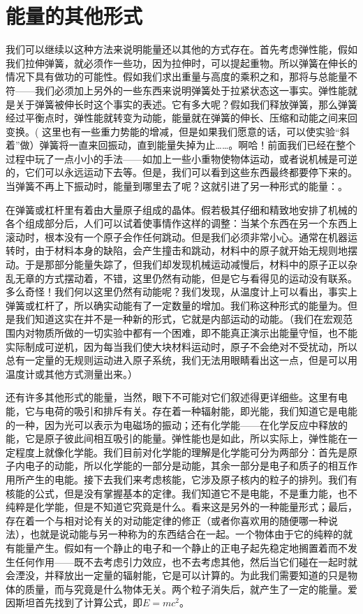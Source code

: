 \section{能量的其他形式}

我们可以继续以这种方法来说明能量还以其他的方式存在。首先考虑弹性能，假如我们拉伸弹簧，就必须作一些功，因为拉伸时，可以提起重物。所以弹簧在伸长的情况下具有做功的可能性。假如我们求出重量与高度的乘积之和，那将与总能量不符——我们必须加上另外的一些东西来说明弹簧处于拉紧状态这一事实。弹性能就是关于弹簧被伸长时这个事实的表述。它有多大呢？假如我们释放弹簧，那么弹簧经过平衡点时，弹性能就转变为动能，能量就在弹簧的伸长、压缩和动能之间来回变换。( 这里也有一些重力势能的增减，但是如果我们愿意的话，可以使实验“斜着”做）弹簧将一直来回振动，直到能量失掉为止……。啊哈！前面我们已经在整个过程中玩了一点小小的手法——如加上一些小重物使物体运动，或者说机械是可逆的，它们可以永远运动下去等。但是，我们可以看到这些东西最终都要停下来的。当弹簧不再上下振动时，能量到哪里去了呢？这就引进了另一种形式的能量：。

在弹簧或杠杆里有着由大量原子组成的晶体。假若极其仔细和精致地安排了机械的各个组成部分后，人们可以试着使事情作这样的调整：当某个东西在另一个东西上滚动时，根本没有一个原子会作任何跳动。但是我们必须非常小心。通常在机器运转时，由于材料本身的缺陷，会产生撞击和跳动，材料中的原子就开始无规则地摆动。于是那部分能量失踪了，但我们却发现机械运动减慢后，材料中的原子正以杂乱无章的方式摆动着，不错，这里仍然有动能，但是它与看得见的运动没有联系。多么奇怪！我们何以这里仍然有动能呢？我们发现，从温度计上可以看出，事实上弹簧或杠杆了，所以确实动能有了一定数量的增加。我们称这种形式的能量为。但是我们知道这实在并不是一种新的形式，它就是内部运动的动能。（我们在宏观范围内对物质所做的一切实验中都有一个困难，即不能真正演示出能量守恒，也不能实际制成可逆机，因为每当我们使大块材料运动时，原子不会绝对不受扰动，所以总有一定量的无规则运动进入原子系统，我们无法用眼睛看出这一点，但是可以用温度计或其他方式测量出来。）

还有许多其他形式的能量，当然，眼下不可能对它们叙述得更详细些。这里有电能，它与电荷的吸引和排斥有关。存在着一种辐射能，即光能，我们知道它是电能的一种，因为光可以表示为电磁场的振动；还有化学能——在化学反应中释放的能，它是原子彼此间相互吸引的能量。弹性能也是如此，所以实际上，弹性能在一定程度上就像化学能。我们目前对化学能的理解是化学能可分为两部分：首先是原子内电子的动能，所以化学能的一部分是动能，其余一部分是电子和质子的相互作用所产生的电能。接下去我们来考虑核能，它涉及原子核内的粒子的排列。我们有核能的公式，但是没有掌握基本的定律。我们知道它不是电能，不是重力能，也不纯粹是化学能，但是不知道它究竟是什么。看来这是另外的一种能量形式；最后，存在着一个与相对论有关的对动能定律的修正（或者你喜欢用的随便哪一种说法），也就是说动能与另一种称为的东西结合在一起。一个物体由于它的纯粹的就有能量产生。假如有一个静止的电子和一个静止的正电子起先稳定地搁置着而不发生任何作用——既不去考虑引力效应，也不去考虑其他，然后当它们碰在一起时就会湮没，并释放出一定量的辐射能，它是可以计算的。为此我们需要知道的只是物体的质量，而与究竟是什么物体无关。两个粒子消失后，就产生了一定的能量。爱因斯坦首先找到了计算公式，即$ E=mc^2 $。

